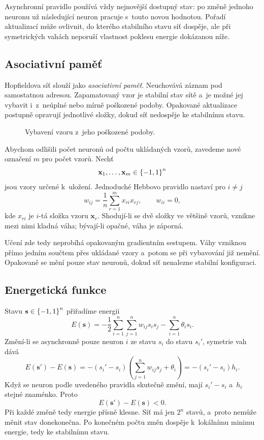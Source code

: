 Asynchronní pravidlo používá vždy nejnovější dostupný stav: po změně jednoho neuronu už následující neuron pracuje s~touto novou hodnotou. Pořadí aktualizací může ovlivnit, do kterého stabilního stavu síť dospěje, ale při symetrických vahách neporuší vlastnost poklesu energie dokázanou níže.

\subsection{Asociativní paměť}

Hopfieldova síť slouží jako \emph{asociativní paměť}. Neuchovává záznam pod samostatnou adresou. Zapamatovaný vzor je stabilní stav sítě a~je možné jej vybavit i~z~neúplné nebo mírně poškozené podoby. Opakované aktualizace postupně opravují jednotlivé složky, dokud síť nedospěje ke stabilnímu stavu.

\begin{figure}[ht]
    \centering
    
    \caption{Vybavení vzoru z~jeho poškozené podoby.}
    \label{fig:ai-hopfield-vybaveni}
\end{figure}

Abychom odlišili počet neuronů od počtu ukládaných vzorů, zavedeme nové označení \(m\) pro počet vzorů. Nechť
\[
    \mathbf{x}_1,\ldots,\mathbf{x}_m
    \in\left\{-1,1\right\}^{n}
\]
jsou vzory určené k~uložení. Jednoduché Hebbovo pravidlo nastaví pro \(i\neq j\)
\[
    w_{ij}
    =
    \frac1n
    \sum_{r=1}^{m}x_{ri}x_{rj},
    \qquad
    w_{ii}=0,
\]
kde \(x_{ri}\) je \(i\)-tá složka vzoru \(\mathbf{x}_r\). Shodují-li se dvě složky ve většině vzorů, vznikne mezi nimi kladná váha; bývají-li opačné, váha je záporná.

Učení zde tedy neprobíhá opakovaným gradientním sestupem. Váhy vzniknou přímo jedním součtem přes ukládané vzory a~potom se při vybavování již nemění. Opakovaně se mění pouze stav neuronů, dokud síť nenalezne stabilní konfiguraci.

\subsection{Energetická funkce}

Stavu \(\mathbf{s}\in\left\{-1,1\right\}^{n}\) přiřadíme energii
\[
    E(\mathbf{s})
    =
    -\frac12
    \sum_{i=1}^{n}\sum_{j=1}^{n}
    w_{ij}s_is_j
    -
    \sum_{i=1}^{n}\theta_i s_i.
\]
Změní-li se asynchronně pouze neuron \(i\) ze stavu \(s_i\) do stavu \(s_i'\), symetrie vah dává
\[
    E(\mathbf{s}')
    -
    E(\mathbf{s})
    =
    -(s_i'-s_i)
    \left(
        \sum_{j=1}^{n}w_{ij}s_j+\theta_i
    \right)
    =
    -(s_i'-s_i)h_i.
\]
Když se neuron podle uvedeného pravidla skutečně změní, mají \(s_i'-s_i\) a~\(h_i\) stejné znaménko. Proto
\[
    E(\mathbf{s}')-E(\mathbf{s})<0.
\]
Při každé změně tedy energie přísně klesne. Síť má jen \(2^n\) stavů, a~proto nemůže měnit stav donekonečna. Po konečném počtu změn dospěje k~lokálnímu minimu energie, tedy ke stabilnímu stavu.

